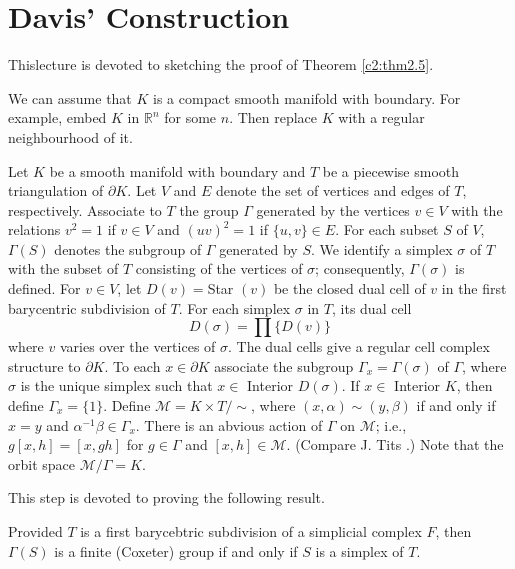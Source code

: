\chapter{Davis' Construction}\label{c3}

This\pageoriginale lecture is devoted to sketching the proof of Theorem
\ref{c2:thm2.5}.

\begin{step}\label{c3:step1}
  We can assume that $K$ is a compact smooth manifold with
  boun\-dary. For example, embed $K$ in $\mathbb{R}^n$ for some
  $n$. Then replace $K$ with a regular neighbourhood of it.
\end{step}

\begin{step}\label{c3:step2}
  Let $K$ be a smooth manifold with boundary and $T$ be a piecewise
  smooth triangulation of $\partial K$. Let $V$ and $E$ denote the set
  of vertices and edges of $T$, respectively. Associate to $T$ the
  group $\Gamma$ generated by the vertices $v \in V$ with the
  relations $v^2 =1$ if $v \in V$ and $(uv)^2=1$ if $\{ u, v\} \in
  E$. For each subset $S$ of $V$, $\Gamma (S)$ denotes the subgroup of
  $\Gamma$ generated by $S$. We identify a simplex $\sigma$ of $T$
  with the subset of $T$ consisting of the vertices of $\sigma$;
  consequently, $\Gamma (\sigma)$ is defined. For $v \in V$, let
  $D(v)=$Star $(v)$ be the closed dual cell of $v$ in the first
  barycentric subdivision of $T$. For each simplex $\sigma$ in $T$,
  its dual cell 
  $$
  D(\sigma) = \prod \{ D(v)\}
  $$
  where $v$ varies over the vertices of $\sigma$. The dual cells give
  a regular cell complex structure to $\partial K$. To each $x \in
  \partial K$ associate the subgroup $\Gamma_x =\Gamma(\sigma)$ of
  $\Gamma$, where $\sigma$ is the unique simplex such that $x \in $
  Interior $D (\sigma)$. If $x \in$ Interior $K$, then define
  $\Gamma_x=\{1\}$. Define $\mathcal{M}= K \times T/ \sim$, where $(x,
  \alpha) \sim (y, \beta)$ if and only if $x=y$ and $\alpha^{-1} \beta
  \in \Gamma_x$. There is an abvious action of $\Gamma$ on $\mathcal{M}$;
  i.e., $g[x, h]= [x, gh]$ for $g \in \Gamma$ and $[x, h]\in
  \mathcal{M}$. (Compare J. Tits \cite{95}.) Note that the orbit space
  $\mathcal{M}/\Gamma =K$. 
\end{step}

\begin{step}\label{c3:step3}
  This step is devoted to proving the following result.
\end{step}

\begin{lemma}\label{c3:lem3.1}
  Provided $T$ is a first barycebtric subdivision of a simplicial
  complex $F$, then $\Gamma(S)$ is a finite (Coxeter) group if and
  only if $S$ is a simplex of $T$.
\end{lemma}

